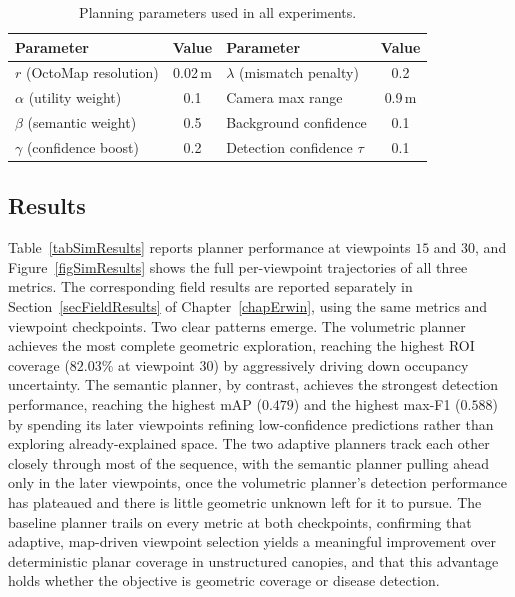 \begin{table}[h]
\caption{Planning parameters used in all experiments.}
\label{tabPlanningParams}
\centering
\small
\setlength{\tabcolsep}{4pt}
\renewcommand{\arraystretch}{0.9}
\begin{tabular}{l c @{\hskip 12pt} l c}
\toprule
Parameter & Value & Parameter & Value \\
\midrule
$r$ (OctoMap resolution) & 0.02\,m & $\lambda$ (mismatch penalty) & 0.2 \\
$\alpha$ (utility weight) & 0.1 & Camera max range & 0.9\,m \\
$\beta$ (semantic weight) & 0.5 & Background confidence & 0.1 \\
$\gamma$ (confidence boost) & 0.2 & Detection confidence $\tau$ & 0.1 \\
\bottomrule
\end{tabular}
\end{table}

\subsection{Results} \label{secSimResults}

Table~\ref{tabSimResults} reports planner performance at viewpoints $15$
and $30$, and Figure~\ref{figSimResults} shows the full per-viewpoint
trajectories of all three metrics.
The corresponding field results are reported separately in
Section~\ref{secFieldResults} of Chapter~\ref{chapErwin}, using the same
metrics and viewpoint checkpoints.
Two clear patterns emerge.
The volumetric planner achieves the most complete geometric exploration,
reaching the highest ROI coverage ($82.03\%$ at viewpoint $30$) by
aggressively driving down occupancy uncertainty.
The semantic planner, by contrast, achieves the strongest detection
performance, reaching the highest mAP ($0.479$) and the highest max-F1
($0.588$) by spending its later viewpoints refining low-confidence
predictions rather than exploring already-explained space.
The two adaptive planners track each other closely through most of the
sequence, with the semantic planner pulling ahead only in the later
viewpoints, once the volumetric planner's detection performance has
plateaued and there is little geometric unknown left for it to pursue.
The baseline planner trails on every metric at both checkpoints, confirming
that adaptive, map-driven viewpoint selection yields a meaningful
improvement over deterministic planar coverage in unstructured canopies,
and that this advantage holds whether the objective is geometric coverage
or disease detection.

